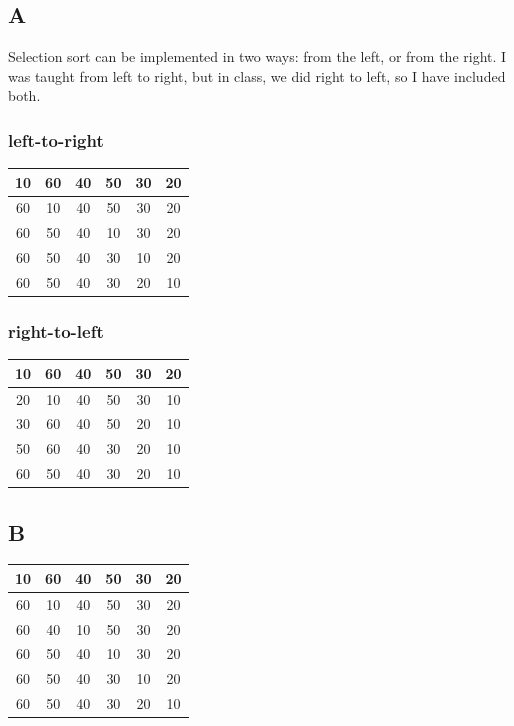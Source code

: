 \documentclass[12pt]{article} %
\begin{document}
\section{}
\subsection{A}
Selection sort can be implemented in two ways: from the left, or from the right.  I was taught from left to right, but in class, we did right to left, so I have included both.
\subsubsection{left-to-right}
\begin{tabular}{|c|c|c|c|c|c|}
\hline
10&60&40&50&30&20\\ \hline
60&10&40&50&30&20\\ \hline
60&50&40&10&30&20\\ \hline
60&50&40&30&10&20\\ \hline
60&50&40&30&20&10\\ \hline
\end{tabular}
\subsubsection{right-to-left}
\begin{tabular}{|c|c|c|c|c|c|}
\hline
10&60&40&50&30&20\\ \hline
20&10&40&50&30&10\\ \hline
30&60&40&50&20&10\\ \hline
50&60&40&30&20&10\\ \hline
60&50&40&30&20&10\\ \hline
\end{tabular}
\subsection{B}
\begin{tabular}{|c|c|c|c|c|c|}
\hline
10&60&40&50&30&20\\ \hline
60&10&40&50&30&20\\ \hline
60&40&10&50&30&20\\ \hline
60&50&40&10&30&20\\ \hline
60&50&40&30&10&20\\ \hline
60&50&40&30&20&10\\ \hline
\end{tabular}
\end{document}
